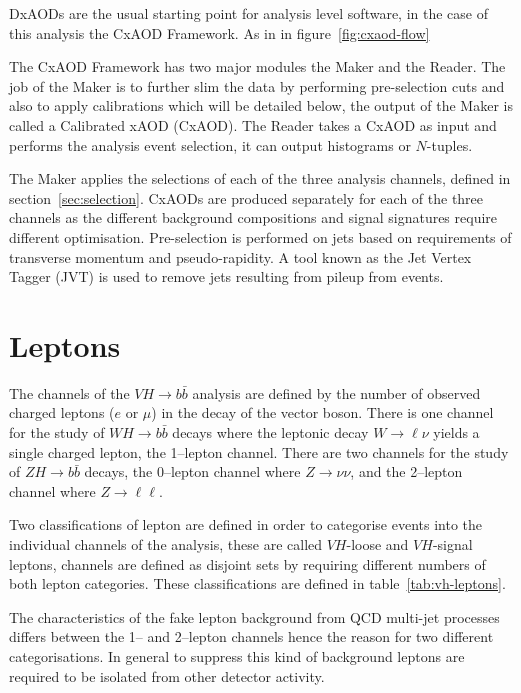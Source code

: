 DxAODs are the usual starting point for analysis level software, in the case of
this analysis the CxAOD Framework. As in in figure~\ref{fig:cxaod-flow}

The CxAOD Framework has two major modules the Maker and the Reader. The job of
the Maker is to further slim the data by performing pre-selection cuts and also
to apply calibrations which will be detailed below, the output of the Maker is
called a Calibrated xAOD (CxAOD). The Reader takes a CxAOD as input and performs
the analysis event selection, it can output histograms or $N$-tuples.

The Maker applies the selections of each of the three analysis channels, defined
in section~\ref{sec:selection}. CxAODs are produced separately for each of the
three channels as the different background compositions and signal signatures
require different optimisation. Pre-selection is performed on jets based on
requirements of transverse momentum and pseudo-rapidity. A tool known as the Jet
Vertex Tagger (JVT) is used to remove jets resulting from pileup from events.

\section{Leptons}%
\label{sec:lepton}

The channels of the $VH \to b\bar{b}$ analysis are defined by the number of
observed charged leptons ($e$ or $\mu$) in the decay of the vector boson. There
is one channel for the study of $WH \to b\bar{b}$ decays where the leptonic
decay $W \rightarrow \ell\nu$ yields a single charged lepton, the 1--lepton
channel. There are two channels for the study of $ZH \to b\bar{b}$ decays, the
0--lepton channel where $Z \rightarrow \nu\nu$, and the 2--lepton channel where
$Z \rightarrow \ell\ell$.

Two classifications of lepton are defined in order to categorise events into the
individual channels of the analysis, these are called $VH$-loose and $VH$-signal
leptons, channels are defined as disjoint sets by requiring different numbers of
both lepton categories. These classifications are defined in
table~\ref{tab:vh-leptons}.

The characteristics of the fake lepton background from QCD multi-jet processes
differs between the 1-- and 2--lepton channels hence the reason for two
different categorisations. In general to suppress this kind of background
leptons are required to be isolated from other detector activity.

